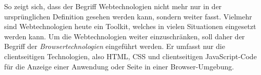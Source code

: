 So zeigt sich, dass der Begriff Webtechnologien nicht mehr nur in der ursprünglichen Definition gesehen werden kann,
sondern weiter fasst. Vielmehr sind Webtechnologien heute ein Toolkit, welches in vielen Situationen eingesetzt werden
kann. Um die Webtechnologien weiter einzuschränken, soll daher der Begriff der \emph{Browsertechnologien} eingeführt werden. 
Er umfasst nur die clientseitigen Technologien, also HTML, CSS und clientseitigen JavaScript-Code 
für die Anzeige einer Anwendung oder Seite in einer Browser-Umgebung.

